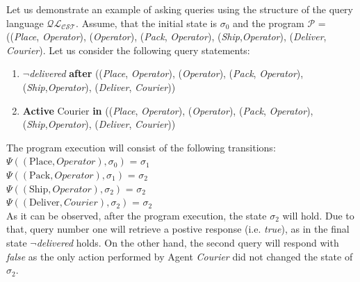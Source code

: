 \documentclass[a4paper]{article}
\begin{document}
Let us demonstrate an example of asking queries using the structure of the query language $\mathcal{QL_{CST}}$. 
Assume, that the initial state is $\sigma_0$ and the program $\mathcal{P}$ = ((\textit{Place}, \textit{Operator}), (\textit{Operator}), (\textit{Pack}, \textit{Operator}), (\textit{Ship},\textit{Operator}), (\textit{Deliver}, \textit{Courier}).
Let us consider the following query statements:
\begin{enumerate}
  \item $\neg$\textit{delivered} \textbf{after} ((\textit{Place}, \textit{Operator}), (\textit{Operator}), (\textit{Pack}, \textit{Operator}), (\textit{Ship},\textit{Operator}), (\textit{Deliver}, \textit{Courier}))
  \item \textbf{Active} Courier \textbf{in} ((\textit{Place}, \textit{Operator}), (\textit{Operator}), (\textit{Pack}, \textit{Operator}), (\textit{Ship},\textit{Operator}), (\textit{Deliver}, \textit{Courier}))
\end{enumerate}
The program execution will consist of the following transitions: \\[0.5\baselineskip]
$\Psi((\text{Place},Operator),\sigma_0)$ = $\sigma_1$ \\[0.1\baselineskip]
$\Psi((\text{Pack},Operator),\sigma_1)$ = $\sigma_2$ \\[0.1\baselineskip]
$\Psi((\text{Ship},Operator),\sigma_2)$ = $\sigma_2$ \\[0.1\baselineskip]
$\Psi((\text{Deliver},Courier),\sigma_2)$ = $\sigma_2$ \\[0.7\baselineskip]
As it can be observed, after the program execution, the state $\sigma_2$ will hold. Due to that, query number one will retrieve a postive response (i.e. \textit{true}), 
as in the final state $\neg$\textit{delivered} holds. 
On the other hand, the second query will respond with \textit{false} as the only action performed by Agent \textit{Courier} did not changed the state of $\sigma_2$.
\end{document}
